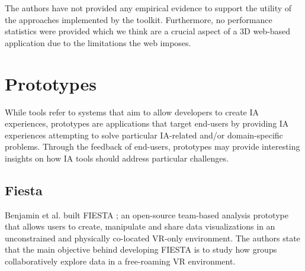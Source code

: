 \documentclass{vgtc}                          %
\begin{document}
\noindent The authors have not provided any empirical evidence to support the utility of the approaches
implemented by the toolkit. Furthermore, no performance statistics were provided which we think are a crucial
aspect of a 3D web-based application due to the limitations the web imposes.

\section{Prototypes}

While tools refer to systems that aim to allow developers to create IA
experiences, prototypes are applications that target end-users by providing IA
experiences attempting to solve particular IA-related and/or domain-specific
problems. Through the feedback of end-users, prototypes may provide interesting
insights on how IA tools should address particular challenges.


\subsection{Fiesta}

\noindent Benjamin et al. built FIESTA \cite{fiesta_prototype}; an open-source
\cite{fiesta:repo} team-based analysis prototype that allows users to create, manipulate and share data visualizations
in an unconstrained and physically co-located VR-only environment. The authors
state that the main objective behind developing FIESTA is to study how groups
collaboratively explore data in a free-roaming VR environment.

\medskip
\end{document}
